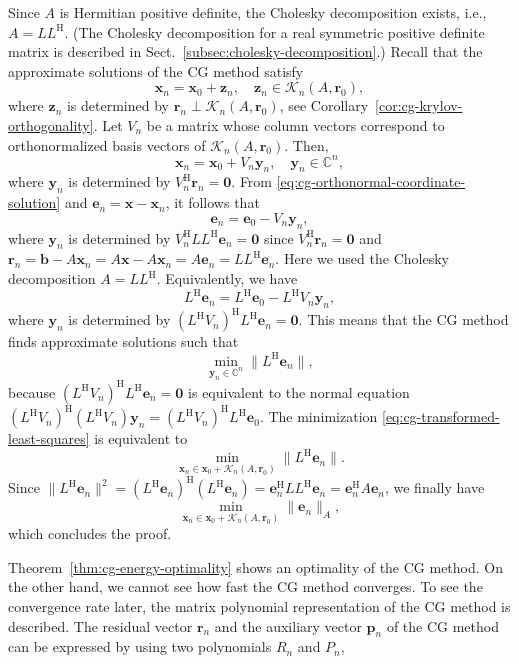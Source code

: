 \begin{Proof}
{Since $A$ is Hermitian positive definite, the Cholesky decomposition exists, i.e., $A=LL^{\mathrm H}$. (The Cholesky decomposition for a real symmetric positive definite matrix is described in Sect.\ \ref{subsec:cholesky-decomposition}.) Recall that the approximate solutions of the CG method satisfy}
\[\bm x_n=\bm x_0+\bm z_n,\quad\bm z_n\in\mathcal K_n(A,\bm r_0),\]
{where $\bm z_n$ is determined by $\bm r_n\perp\mathcal K_n(A,\bm r_0)$, see Corollary\ \ref{cor:cg-krylov-orthogonality}. Let $V_n$ be a matrix whose column vectors correspond to orthonormalized basis vectors of $\mathcal K_n(A,\bm r_0)$. Then,}
\begin{equation}\label{eq:cg-orthonormal-coordinate-solution}\bm x_n=\bm x_0+V_n\bm y_n,\quad\bm y_n\in\mathbb C^n,\end{equation}
{where $\bm y_n$ is determined by $V_n^{\mathrm H}\bm r_n=\bm0$. From \eqref{eq:cg-orthonormal-coordinate-solution} and $\bm e_n=\bm x-\bm x_n$, it follows that}
\[\bm e_n=\bm e_0-V_n\bm y_n,\]
{where $\bm y_n$ is determined by $V_n^{\mathrm H}LL^{\mathrm H}\bm e_n=\bm0$ since $V_n^{\mathrm H}\bm r_n=\bm0$ and $\bm r_n=\bm b-A\bm x_n=A\bm x-A\bm x_n=A\bm e_n=LL^{\mathrm H}\bm e_n$. Here we used the Cholesky decomposition $A=LL^{\mathrm H}$. Equivalently, we have}
\[L^{\mathrm H}\bm e_n=L^{\mathrm H}\bm e_0-L^{\mathrm H}V_n\bm y_n,\]
{where $\bm y_n$ is determined by $(L^{\mathrm H}V_n)^{\mathrm H}L^{\mathrm H}\bm e_n=\bm0$. This means that the CG method finds approximate solutions such that}
\begin{equation}\label{eq:cg-transformed-least-squares}\min_{\bm y_n\in\mathbb C^n}\|L^{\mathrm H}\bm e_n\|,\end{equation}
{because $(L^{\mathrm H}V_n)^{\mathrm H}L^{\mathrm H}\bm e_n=\bm0$ is equivalent to the normal equation $(L^{\mathrm H}V_n)^{\mathrm H}(L^{\mathrm H}V_n)\bm y_n=(L^{\mathrm H}V_n)^{\mathrm H}L^{\mathrm H}\bm e_0$. The minimization \eqref{eq:cg-transformed-least-squares} is equivalent to}
\[\min_{\bm x_n\in\bm x_0+\mathcal K_n(A,\bm r_0)}\|L^{\mathrm H}\bm e_n\|.\]
{Since $\|L^{\mathrm H}\bm e_n\|^2=(L^{\mathrm H}\bm e_n)^{\mathrm H}(L^{\mathrm H}\bm e_n)=\bm e_n^{\mathrm H}LL^{\mathrm H}\bm e_n=\bm e_n^{\mathrm H}A\bm e_n$, we finally have}
\[\min_{\bm x_n\in\bm x_0+\mathcal K_n(A,\bm r_0)}\|\bm e_n\|_A,\]
{which concludes the proof.}\end{Proof}
{Theorem\ \ref{thm:cg-energy-optimality} shows an optimality of the CG method. On the other hand, we cannot see how fast the CG method converges. To see the convergence rate later, the matrix polynomial representation of the CG method is described. The residual vector $\bm r_n$ and the auxiliary vector $\bm p_n$ of the CG method can be expressed by using two polynomials $R_n$ and $P_n$,}
